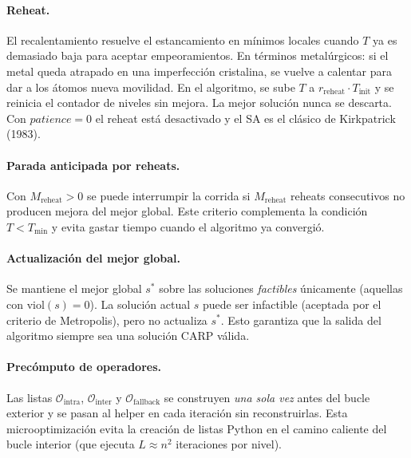 \documentclass[12pt, a4paper]{article}
\begin{document}
\paragraph{Reheat.}
El recalentamiento resuelve el estancamiento en mínimos locales cuando $T$ ya es
demasiado baja para aceptar empeoramientos. En términos metalúrgicos: si el metal
queda atrapado en una imperfección cristalina, se vuelve a calentar para dar a
los átomos nueva movilidad. En el algoritmo, se sube $T$ a $r_{\mathrm{reheat}}
\cdot T_{\mathrm{init}}$ y se reinicia el contador de niveles sin mejora. La
mejor solución nunca se descarta. Con $\mathit{patience} = 0$ el reheat está
desactivado y el SA es el clásico de Kirkpatrick (1983).

\paragraph{Parada anticipada por reheats.}
Con $M_{\mathrm{reheat}} > 0$ se puede interrumpir la corrida si $M_{\mathrm{reheat}}$
reheats consecutivos no producen mejora del mejor global. Este criterio complementa
la condición $T < T_{\mathrm{min}}$ y evita gastar tiempo cuando el algoritmo ya
convergió.

\paragraph{Actualización del mejor global.}
Se mantiene el mejor global $s^{*}$ sobre las soluciones \emph{factibles}
únicamente (aquellas con $\mathrm{viol}(s) = 0$). La solución actual $s$ puede
ser infactible (aceptada por el criterio de Metropolis), pero no actualiza $s^{*}$.
Esto garantiza que la salida del algoritmo siempre sea una solución CARP válida.

\paragraph{Precómputo de operadores.}
Las listas $\mathcal{O}_{\mathrm{intra}}$, $\mathcal{O}_{\mathrm{inter}}$ y
$\mathcal{O}_{\mathrm{fallback}}$ se construyen \emph{una sola vez} antes del
bucle exterior y se pasan al helper en cada iteración sin reconstruirlas. Esta
microoptimización evita la creación de listas Python en el camino caliente del
bucle interior (que ejecuta $L \approx n^{2}$ iteraciones por nivel).
\end{document}
